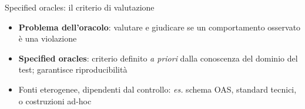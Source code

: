 
\begin{frame}{Specified oracles: il criterio di valutazione}
  \begin{itemize}
    \item \textbf{Problema dell'oracolo}: valutare e giudicare se un \alert{comportamento osservato} è una \alert{violazione}

    \item \textbf{Specified oracles}: criterio definito \textit{a priori} dalla \alert{conoscenza del dominio} del test; garantisce \alert{riproducibilità}

    \item \alert{Fonti eterogenee}, dipendenti dal controllo: \textit{es.} schema OAS, standard tecnici, o costruzioni ad-hoc
  \end{itemize}
\end{frame}